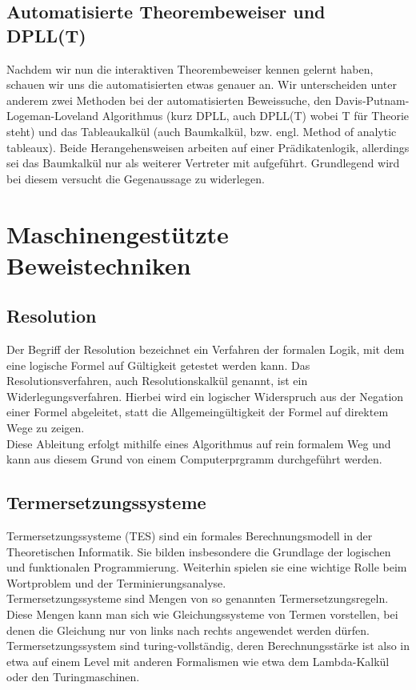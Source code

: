 \subsection{Automatisierte Theorembeweiser und DPLL(T)}
Nachdem wir nun die interaktiven Theorembeweiser kennen gelernt haben, schauen
wir uns die automatisierten etwas genauer an.
Wir unterscheiden unter anderem
zwei Methoden bei der automatisierten Beweissuche, den Davis-Putnam-Logeman-Loveland Algorithmus (kurz DPLL, auch DPLL(T) wobei T für Theorie steht) und das
Tableaukalkül (auch Baumkalkül, bzw. engl. Method of analytic tableaux).
Beide Herangehensweisen arbeiten auf einer Prädikatenlogik, allerdings sei das Baumkalkül
nur als weiterer Vertreter mit aufgeführt.
Grundlegend wird bei diesem versucht die
 Gegenaussage zu widerlegen.

\section{Maschinengestützte Beweistechniken}

\subsection{Resolution}
Der Begriff der Resolution bezeichnet ein Verfahren der formalen Logik, mit dem eine logische Formel auf Gültigkeit getestet werden kann. Das Resolutionsverfahren, auch Resolutionskalkül genannt, ist ein Widerlegungsverfahren. Hierbei wird ein logischer Widerspruch aus der Negation einer Formel abgeleitet, statt die Allgemeingültigkeit der Formel auf direktem Wege zu zeigen.\\
Diese Ableitung erfolgt mithilfe eines Algorithmus auf rein formalem Weg und kann aus diesem Grund von einem Computerprgramm durchgeführt werden.\\

\subsection{Termersetzungssysteme}
Termersetzungssysteme (TES) sind ein formales Berechnungsmodell in der Theoretischen Informatik. Sie bilden insbesondere die Grundlage der logischen und funktionalen Programmierung. Weiterhin spielen sie eine wichtige Rolle beim Wortproblem und der Terminierungsanalyse.\\
Termersetzungssysteme sind Mengen von so genannten Termersetzungsregeln. Diese Mengen kann man sich wie Gleichungssysteme von Termen vorstellen, bei denen die Gleichung nur von links nach rechts angewendet werden dürfen.\\
Termersetzungssystem sind turing-vollständig, deren Berechnungsstärke ist also in etwa auf einem Level mit anderen Formalismen wie etwa dem Lambda-Kalkül oder den Turingmaschinen.

